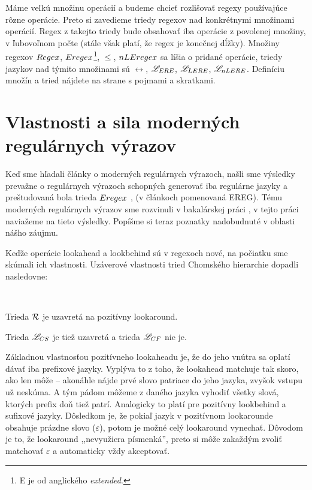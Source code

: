 Máme veľkú množinu operácií a budeme chcieť rozlišovať regexy používajúce rôzne operácie. Preto si zavedieme triedy regexov nad konkrétnymi množinami operácií. Regex z takejto triedy bude obsahovať iba operácie z povolenej množiny, v ľubovoľnom počte (stále však platí, že regex je konečnej dĺžky). Množiny regexov $Regex$, $Eregex$\footnote{E je od anglického \textit{extended}.}, $\le$, $nLEregex$ sa líšia o pridané operácie, triedy jazykov nad týmito množinami sú $\rel$, $\mathscr{L}_{ERE}$, $\mathscr{L}_{LERE}$, $\mathscr{L}_{nLERE}$. Definíciu množín a tried nájdete na strane s pojmami a skratkami.

\section[Vlastnosti a sila]{Vlastnosti a sila moderných regulárnych výrazov}
\label{usila}

Keď sme hľadali články o moderných regulárnych výrazoch, našli sme výsledky prevažne o regulárnych výrazoch schopných generovať iba regulárne jazyky a preštudovaná bola trieda $Eregex$ \cite{ExtendedRegexPower}, \cite{ExtendedRegexIntersec} (v článkoch pomenovaná EREG). Tému moderných regulárnych výrazov sme rozvinuli v bakalárskej práci \cite{mojaBak}, v tejto práci naviažeme na tieto výsledky. Popíšme si teraz poznatky nadobudnuté v oblasti nášho záujmu.

Keďže operácie lookahead a lookbehind sú v regexoch nové, na počiatku sme skúmali ich vlastnosti. Uzáverové vlastnosti tried Chomského hierarchie dopadli nasledovne:
\begin{veta} \textbf{\emph{\cite[Veta 2.2.5.]{mojaBak}}}\label{lookaround+R} \ \par
Trieda ${\cal R}$ je uzavretá na pozitívny lookaround.
\end{veta}
Trieda $\mathscr{L}_{CS}$ je tiež uzavretá a trieda $\mathscr{L}_{CF}$ nie je.

Základnou vlastnosťou pozitívneho lookaheadu je, že do jeho vnútra sa oplatí dávať iba prefixové jazyky. Vyplýva to z toho, že lookahead matchuje tak skoro, ako len môže -- akonáhle nájde prvé slovo patriace do jeho jazyka, zvyšok vstupu už neskúma. A tým pádom môžeme z daného jazyka vyhodiť všetky slová, ktorých prefix doň tiež patrí. Analogicky to platí pre pozitívny lookbehind a sufixové jazyky. Dôsledkom je, že pokiaľ jazyk v pozitívnom lookarounde obsahuje prázdne slovo ($\varepsilon$), potom je možné celý lookaround vynechať. Dôvodom je to, že lookaround ,,nevyužiera písmenká'', preto si môže zakaždým zvoliť matchovať $\varepsilon$ a automaticky vždy akceptovať.

